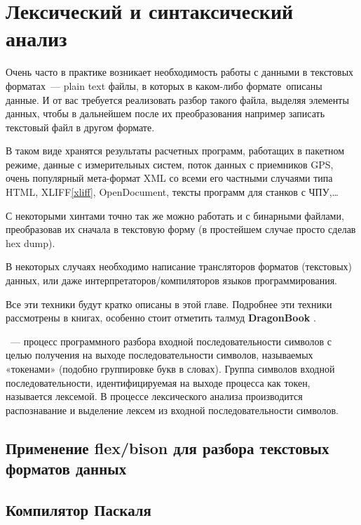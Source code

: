 \chapter{Лексический и синтаксический анализ}

Очень часто в практике возникает необходимость работы с данными в текстовых
форматах\ --- plain text файлы, в которых в каком-либо формате\ описаны данные. И от вас
требуется реализовать разбор такого файла, выделяя элементы данных, чтобы в
дальнейшем после их преобразования например записать текстовый файл в другом
формате.

В таком виде хранятся результаты расчетных программ, работащих в пакетном
режиме, данные с измерительных систем, поток данных с приемников GPS, очень популярный мета-формат XML со всеми его частными случаями типа
HTML, XLIFF\ref{xliff}, OpenDocument, тексты программ для станков с ЧПУ,\ldots

С некоторыми хинтами точно так же можно работать и с бинарными файлами,
преобразовав их сначала в текстовую форму (в простейшем случае просто сделав hex
dump).

В некоторых случаях необходимо написание трансляторов форматов (текстовых)
данных, или даже интерпретаторов/компиляторов языков программирования.

Все эти техники будут кратко описаны в этой главе. Подробнее эти техники
рассмотрены в книгах, особенно стоит отметить талмуд
\textbf{DragonBook} \cite{dragonbook}.

\bigskip
{}\ --- процесс программного разбора входной
последовательности символов с целью получения на выходе последовательности
символов, называемых «токенами» (подобно группировке букв в словах). Группа символов
входной последовательности, идентифицируемая на выходе процесса как токен,
называется лексемой. В процессе лексического анализа производится распознавание
и выделение лексем из входной последовательности символов.

\section{Применение flex/bison для разбора текстовых форматов данных}

\section{Компилятор Паскаля}
